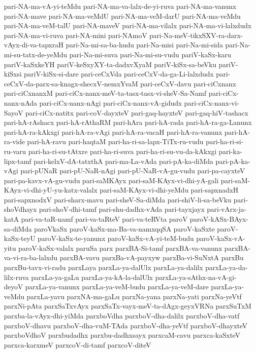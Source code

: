 {pari-NA-ma-vA-yi-teMdu
pari-NA-ma-va-lalx-de-yi-ruva
pari-NA-ma-vanunx
pari-NA-mave
pari-NA-ma-veMdU
pari-NA-ma-veM-darU
pari-NA-ma-veMdu
pari-NA-ma-veM-talU
pari-NA-maveV
pari-NA-ma-vilalx
pari-NA-ma-vi-lalxdudx
pari-NA-ma-vi-ruva
pari-NA-mini
pari-NAmoV
pari-Na-meV-tikxSXV-ra-darx-vAyx-di-va-tapxraH
pari-Na-mi-sa-ba-hudu
pari-Na-misi
pari-Na-mi-sida
pari-Na-mi-su-tatx-de-yeMdu
pari-Na-mi-suva
pari-Na-mi-su-vudu
pariV-kaSx-karu
pariV-kaSxkeYH
pariV-keSxyXY-ta-dadxvXyaM
pariV-kiSx-sa-beVku
pariV-kiSxsi
pariV-kiSx-si-dare
pari-ceCxVda
pari-ceCxV-da-ga-Li-lalxdudx
pari-ceCxV-da-parx-sa-knagx-shecxV-nemxYvaM
pari-ceCxV-davu
pari-ciCxnanx
pari-ciCxnanxM
pari-ciCx-nanx-meV-ta-tasx-tasx-vi-sheV-Sa-Namf
pari-ciCx-nanx-nAda
pari-ciCx-nanx-nAgi
pari-ciCx-nanx-vA-gidudx
pari-ciCx-nanx-vi-SayoV
pari-ciCx-natitx
pari-coV-dayxteV
pari-gaq-hayxteV
pari-gaq-hiV-tashacx
pari-hA-rAshacx
pari-hA-rAthaRM
pari-hAra
pari-hA-rada
pari-hA-ra-ga-Lanunx
pari-hA-ra-kAkxgi
pari-hA-ra-vAgi
pari-hA-ra-vacaH
pari-hA-ra-vanunx
pari-hA-ra-vide
pari-hA-ravu
pari-haqtaM
pari-ha-ri-sa-lapx-TiTx-ru-vudu
pari-ha-ri-si-ru-varu
pari-ha-ri-su-tAtxre
pari-ha-ri-suva
pari-ha-ri-su-vu-da-kAkxgi
pari-ka-lipx-tamf
pari-kelxV-dA-tatxthA
pari-ma-La-vAda
pari-pA-ka-diMda
pari-pA-ka-vAgi
pari-pUNaR
pari-pU-NaR-nAgi
pari-pU-NaR-vA-gu-vudu
pari-pa-cayxteV
pari-pa-kavx-vA-gu-vudu
pari-saMKAyx
pari-saM-KAyx-vi-dhi-yA-gali
pari-saM-KAyx-vi-dhi-yU-yu-katx-valalx
pari-saM-KAyx-vi-dhi-yeMdu
pari-sapxnadxH
pari-sapxnodxV
pari-sharx-mavu
pari-sheV-Sa-diMda
pari-shiV-li-sa-beVku
pari-shoVdhayx
pari-shoV-dhi-tamf
pari-shu-dadhx-vAda
pari-tayxjayx
pari-vArx-ja-katA
pari-va-taR-namf
pari-va-taRteV
pari-va-teRVta
paroV
paroV-kASx-BAyx-sa-diMda
paroVkaSx
paroV-kaSx-ma-Ba-va-namxqqSA
paroV-kaSxte
paroV-kaSx-teyU
paroV-kaSx-te-yanunx
paroV-kaSx-vA-yi-teM-budu
paroV-kaSx-vA-yitu
paroV-kaSx-valalx
paruSa
parx
parxBA-Si-tamf
parxBA-va-vanunx
parxBA-va-vi-ra-ba-lalxdu
parxBA-vavu
parxBa-vA-payxyw
parxBa-vi-SuNxtA
parxBu
parxBu-tavx-vi-radu
parxLaya
parxLa-ya-dalUlx
parxLa-ya-dalilx
parxLa-ya-da-lilx-ruva
parxLa-ya-gaLu
parxLa-ya-kA-la-dalUlx
parxLa-ya-sAthx-na-vA-gi-deyoV
parxLa-ya-vanunx
parxLa-ya-veM-budu
parxLa-ya-veM-dare
parxLa-ya-veMdu
parxLa-yavu
parxNA-ma-gaLu
parxNa-yana
parxNa-yati
parxNa-yeVtf
parxNi-pAta
parxSaTxvAyx
parxSaTx-vayx-meV-ta-dAgx-geyxVRNa
parxSuTxM
parxba-la-vAyx-dhi-yiMda
parxboVdha
parxboV-dha-dalilx
parxboV-dha-vatf
parxboV-dhavu
parxboV-dha-vuM-TAda
parxboV-dha-yeVtf
parxboV-dhayxteV
parxboVdhoV
parxbudadhx
parxbu-dadhxsayx
parxcaM-cavu
parxca-kaSxteV
parxca-karxmeV
parxcoV-di-tamf
parxcoV-diteV
}
